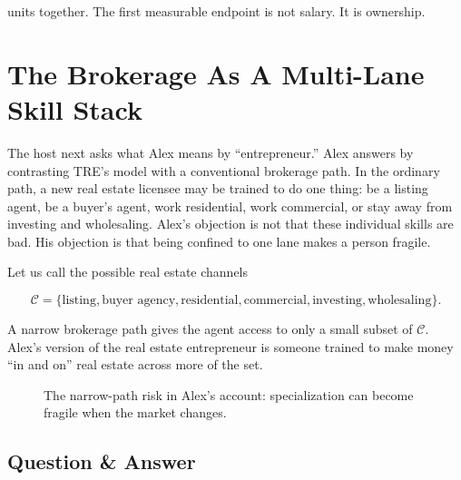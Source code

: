 units together. The first measurable endpoint is not salary. It is ownership.

\section{The Brokerage As A Multi-Lane Skill Stack}

The host next asks what Alex means by ``entrepreneur.'' Alex answers by contrasting TRE's model with a conventional brokerage path. In the ordinary path, a new real estate licensee may be trained to do one thing: be a listing agent, be a buyer's agent, work residential, work commercial, or stay away from investing and wholesaling. Alex's objection is not that these individual skills are bad. His objection is that being confined to one lane makes a person fragile.

Let us call the possible real estate channels

\begin{equation}
\mathcal{C}
=
\{\text{listing},\text{buyer agency},\text{residential},\text{commercial},\text{investing},\text{wholesaling}\}.
\end{equation}

A narrow brokerage path gives the agent access to only a small subset of \(\mathcal{C}\). Alex's version of the real estate entrepreneur is someone trained to make money ``in and on'' real estate across more of the set.

\begin{figure}
\centering
{}
\caption{The narrow-path risk in Alex's account: specialization can become fragile when the market changes.}
\end{figure}

\subsection{Question \& Answer}

